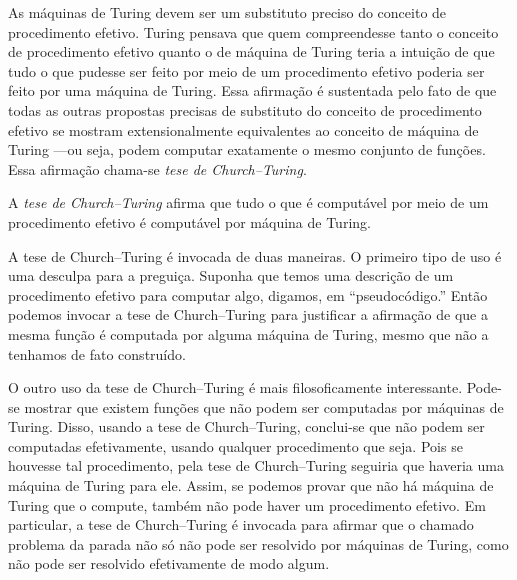 \documentclass[../../../include/open-logic-section]{subfiles}
\begin{document}

As máquinas de Turing devem ser um substituto preciso do
conceito de procedimento efetivo. Turing pensava que quem
compreendesse tanto o conceito de procedimento efetivo quanto o de
máquina de Turing teria a intuição de que tudo o que pudesse
ser feito por meio de um procedimento efetivo poderia ser feito por uma máquina de Turing.
Essa afirmação é sustentada pelo fato de que todas as outras propostas
precisas de substituto do conceito de procedimento efetivo se mostram
extensionalmente equivalentes ao conceito de máquina de Turing
---ou seja, podem computar exatamente o mesmo conjunto de funções. Essa
afirmação chama-se \emph{tese de Church--Turing}.

\begin{defn}
A \emph{tese de Church--Turing} afirma que tudo o que é computável por meio
de um procedimento efetivo é computável por máquina de Turing.
\end{defn}

A tese de Church--Turing é invocada de duas maneiras. O primeiro tipo
de uso é uma desculpa para a preguiça. Suponha
que temos uma descrição de um procedimento efetivo para computar algo,
digamos, em ``pseudocódigo.'' Então podemos invocar a tese de Church--Turing
para justificar a afirmação de que a mesma função é computada por alguma máquina de Turing,
mesmo que não a tenhamos de fato construído.

O outro uso da tese de Church--Turing é mais filosoficamente
interessante. Pode-se mostrar que existem funções que não podem ser
computadas por máquinas de Turing. Disso, usando a tese de Church--Turing,
conclui-se que não podem ser computadas efetivamente, usando
qualquer procedimento que seja. Pois se houvesse tal procedimento, pela
tese de Church--Turing seguiria que haveria uma máquina de Turing para ele. Assim, se podemos provar que não há máquina de Turing
que o compute, também não pode haver um procedimento efetivo. Em
particular, a tese de Church--Turing é invocada para afirmar que o
chamado problema da parada não só não pode ser resolvido por máquinas de Turing,
como não pode ser resolvido efetivamente de modo algum.
\end{document}
